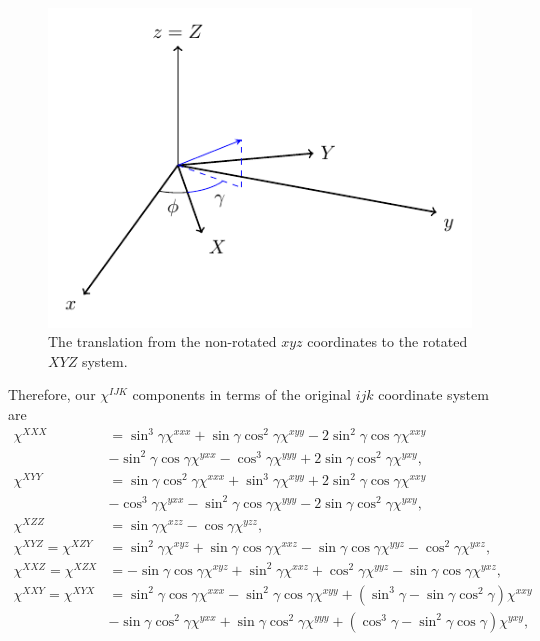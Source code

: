 \documentclass[aps,prb,10pt,letterpaper,notitlepage]{revtex4-1}
\begin{document}
\begin{figure}[b]
\centering
\includegraphics[width=0.5\linewidth]{fig01}
\caption{The translation from the non-rotated $xyz$ coordinates to the rotated
$XYZ$ system.}
\label{fig:axes}
\end{figure}

Therefore, our $\chi^{IJK}$ components in terms of the original $ijk$ coordinate
system are
\begin{equation}\label{eq:xcomps}
\begin{split}
\chi^{XXX} 
&=  \sin^{3}\gamma          \chi^{xxx}
 +  \sin\gamma \cos^{2}\gamma \chi^{xyy}
 - 2\sin^{2}\gamma \cos\gamma \chi^{xxy}\\
&-  \sin^{2}\gamma \cos\gamma \chi^{yxx}
 -  \cos^{3}\gamma          \chi^{yyy}
 + 2\sin\gamma \cos^{2}\gamma \chi^{yxy},\\[10pt]
\chi^{XYY} 
&=  \sin\gamma \cos^{2}\gamma \chi^{xxx}
 +  \sin^{3}\gamma          \chi^{xyy}
 + 2\sin^{2}\gamma \cos\gamma \chi^{xxy}\\
&-  \cos^{3}\gamma          \chi^{yxx}
 -  \sin^{2}\gamma \cos\gamma \chi^{yyy}
 - 2\sin\gamma \cos^{2}\gamma \chi^{yxy},\\[10pt]
\chi^{XZZ} 
&= \sin\gamma \chi^{xzz}
 - \cos\gamma \chi^{yzz},\\[10pt]
\chi^{XYZ} = \chi^{XZY}
&=
   \sin^{2}\gamma      \chi^{xyz}
 + \sin\gamma \cos\gamma \chi^{xxz}
 - \sin\gamma \cos\gamma \chi^{yyz}
 - \cos^{2}\gamma      \chi^{yxz},\\[10pt]
\chi^{XXZ} = \chi^{XZX}
&=
 - \sin\gamma \cos\gamma \chi^{xyz}
 + \sin^{2}\gamma      \chi^{xxz}
 + \cos^{2}\gamma      \chi^{yyz}
 - \sin\gamma \cos\gamma \chi^{yxz},\\[10pt]
\chi^{XXY} = \chi^{XYX} 
&= 
   \sin^{2}\gamma \cos\gamma \chi^{xxx}
 - \sin^{2}\gamma \cos\gamma \chi^{xyy}
 + (\sin^{3}\gamma - \sin\gamma \cos^{2}\gamma) \chi^{xxy}\\
&- \sin\gamma \cos^{2}\gamma \chi^{yxx}
 + \sin\gamma \cos^{2}\gamma \chi^{yyy}
 + (\cos^{3}\gamma - \sin^{2}\gamma \cos\gamma) \chi^{yxy},
\end{split}
\end{equation}
\end{document}
